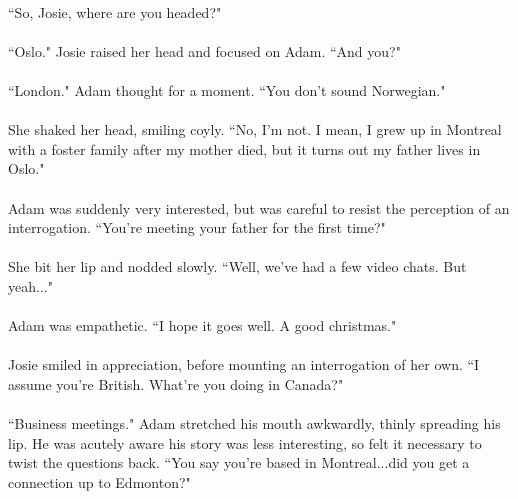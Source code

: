\documentclass{article}
\begin{document}
\paragraph{}
``So, Josie, where are you headed?"

\paragraph{}
``Oslo." Josie raised her head and focused on Adam. ``And you?"

\paragraph{}
``London." Adam thought for a moment. ``You don't sound Norwegian."

\paragraph{}
She shaked her head, smiling coyly. ``No, I'm not. I mean, I grew up in Montreal with a foster family after my mother died, but it turns out my father lives in Oslo."

\paragraph{}
Adam was suddenly very interested, but was careful to resist the perception of an interrogation. ``You're meeting your father for the first time?"

\paragraph{}
She bit her lip and nodded slowly. ``Well, we've had a few video chats. But yeah..."

\paragraph{}
Adam was empathetic. ``I hope it goes well. A good christmas."

\paragraph{}
Josie smiled in appreciation, before mounting an interrogation of her own. ``I assume you're British. What're you doing in Canada?"

\paragraph{}
``Business meetings." Adam stretched his mouth awkwardly, thinly spreading his lip. He was acutely aware his story was less interesting, so felt it necessary to twist the questions back. ``You say you're based in Montreal...did you get a connection up to Edmonton?"
\end{document}
